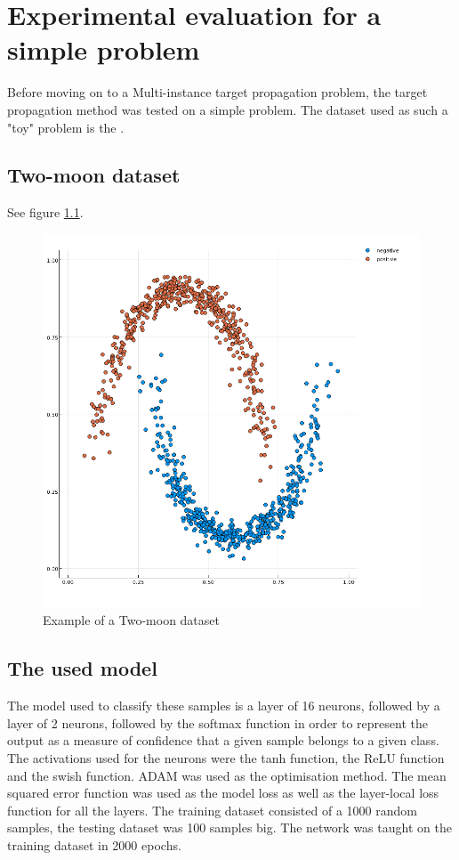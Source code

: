 \chapter{Experimental evaluation for a simple problem}

Before moving on to a Multi-instance target propagation problem, the target propagation method was tested on a simple problem. The dataset used as such a "toy" problem is the .

\section{Two-moon dataset}
See figure \ref{twomoon}.

\begin{figure}[h]
	\centering
	\includegraphics[width=400pt]{images/temp-twomoon.png}
	\caption{Example of a Two-moon dataset}\label{twomoon}
\end{figure}

\section{The used model}

The model used to classify these samples is a layer of 16 neurons, followed by a layer of 2 neurons, followed by the softmax function in order to represent the output as a measure of confidence that a given sample belongs to a given class. The activations used for the neurons were the tanh function, the ReLU function  and the swish function. ADAM  was used as the optimisation method. The mean squared error function was used as the model loss as well as the layer-local loss function for all the layers. The training dataset consisted of a 1000 random samples, the testing dataset was 100 samples big. The network was taught on the training dataset in 2000 epochs.

